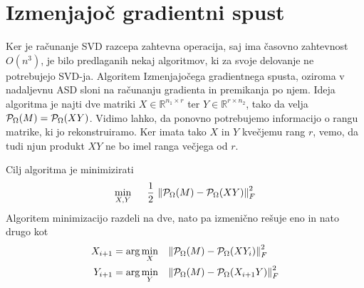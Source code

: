 \section{Izmenjajoč gradientni spust}
Ker je računanje SVD razcepa zahtevna operacija, saj ima časovno zahtevnost
$O(n^3)$, je bilo predlaganih nekaj algoritmov, ki za svoje delovanje ne potrebujejo SVD-ja. Algoritem Izmenjajočega gradientnega spusta, oziroma v nadaljevnu ASD sloni na računanju gradienta in premikanja po njem. Ideja algoritma je najti dve matriki $X \in \mathbb{R}^{n_1 \times r}$ ter $Y \in \mathbb{R}^{r \times n_2}$, tako da velja $\mathcal{P}_\Omega(M) = \mathcal{P}_\Omega(XY)$. Vidimo lahko, da ponovno potrebujemo informacijo o rangu matrike, ki jo rekonstruiramo. Ker imata tako $X$ in $Y$ kvečjemu rang $r$, vemo, da tudi njun produkt $XY$ ne bo imel ranga večjega od $r$. 

Cilj algoritma je minimizirati
\[
    \min_{X, Y} \hspace{0.5cm} \frac{1}{2}\, \left\lVert\mathcal{P}_\Omega(M) - \mathcal{P}_\Omega(XY)\right\rVert_F^2
\] 
Algoritem minimizacijo razdeli na dve, nato pa izmenično rešuje eno in nato drugo kot \cite{AST-TK15}
\begin{align*}
    X_{i+1} &= \arg \min_{X} \hspace{0.3cm} \left\lVert\mathcal{P}_\Omega(M) - \mathcal{P}_\Omega(XY_i)\right\rVert_F^2 \\
    Y_{i+1} &= \arg \min_{Y} \hspace{0.3cm} \left\lVert\mathcal{P}_\Omega(M) - \mathcal{P}_\Omega(X_{i+1}Y)\right\rVert_F^2
\end{align*}


